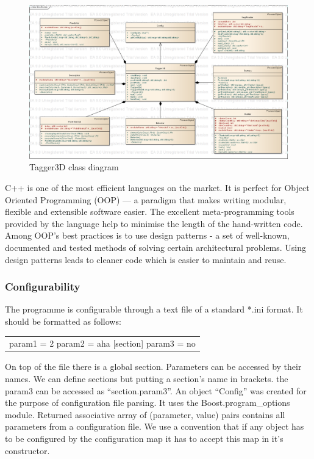	\begin{figure}[ht]
	\centering
	\includegraphics[width=1.0\textwidth]{figs/class}
	\caption{Tagger3D class diagram}
	\label{fig:class_diagram}
	\end{figure}
	
	C++ is one of the most efficient languages on the market. It is perfect for Object Oriented Programming (OOP) --- a paradigm that makes writing modular, flexible and extensible software easier. The excellent meta-programming tools provided by the language help to minimise the length of the hand-written code. Among OOP's best practices is to use design patterns - a set of well-known, documented and tested methods of solving certain architectural problems. Using design patterns leads to cleaner code which is easier to maintain and reuse. 
	
	\subsubsection{Configurability}
	The programme is configurable through a text file of a standard *.ini format. It should be formatted as follows:
	\begin{tabular}{c}
	 param1 = 2
	 param2 = aha
	 [section]
	 param3 = no
	\end{tabular}
	
	On top of the file there is a global section. Parameters can be accessed by their names. We can define sections but putting a section's name in brackets. the param3 can be accessed as ``section.param3''. An object ``Config'' was created for the purpose of configuration file parsing. It uses the Boost.program\_options module. Returned associative array of (parameter, value) pairs contains all parameters from a configuration file. We use a convention that if any object has to be configured by the configuration map it has to accept this map in it's constructor.
	
